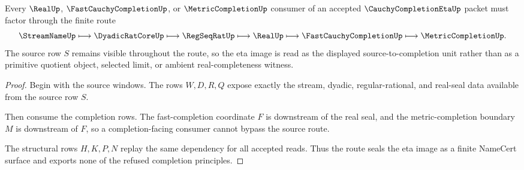 \begin{theorem}
\label{thm:cauchy-completion-eta-real-seal}
Every $\RealUp$, $\FastCauchyCompletionUp$, or $\MetricCompletionUp$ consumer of an accepted $\CauchyCompletionEtaUp$ packet must factor through the finite route
$$
\StreamNameUp
\longmapsto
\DyadicRatCoreUp
\longmapsto
\RegSeqRatUp
\longmapsto
\RealUp
\longmapsto
\FastCauchyCompletionUp
\longmapsto
\MetricCompletionUp .
$$
The source row $S$ remains visible throughout the route, so the eta image is read as the displayed source-to-completion unit rather than as a primitive quotient object, selected limit, or ambient real-completeness witness.
\end{theorem}
\begin{proof}
Begin with the source windows. The rows $W,D,R,Q$ expose exactly the stream, dyadic, regular-rational, and real-seal data available from the source row $S$.

Then consume the completion rows. The fast-completion coordinate $F$ is downstream of the real seal, and the metric-completion boundary $M$ is downstream of $F$, so a completion-facing consumer cannot bypass the source route.

The structural rows $H,K,P,N$ replay the same dependency for all accepted reads. Thus the route seals the eta image as a finite NameCert surface and exports none of the refused completion principles.
\end{proof}




